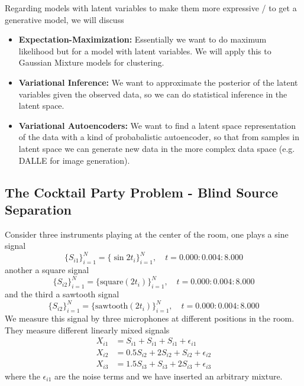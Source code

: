 Regarding models with latent variables to make them more expressive / to
get a generative model, we will discuss

\begin{itemize}
    \item \textbf{Expectation-Maximization:} Essentially we want to do maximum likelihood but for a model with latent variables. We will apply this to Gaussian Mixture models for clustering.
    \item \textbf{Variational Inference:} We want to approximate the posterior of the latent variables given the observed data, so we can do statistical inference in the latent space.
    \item \textbf{Variational Autoencoders:} We want to find a latent space representation of the data with a kind of probabalistic autoencoder,
          so that from samples in latent space we can generate new data in the more complex data space (e.g. DALLE for image generation).
\end{itemize}

\subsection{The Cocktail Party Problem - Blind Source Separation}
Consider three instruments playing at the center of the room, one plays a sine signal
\begin{equation}
    \{S_{i1}\}_{i=1}^N = \{ \sin 2t_i \}_{i=1}^N, \quad t = 0.000:0.004:8.000
\end{equation}
another a square signal
\begin{equation}
    \{S_{i2}\}_{i=1}^N = \{ \text{square}(2t_i) \}_{i=1}^N, \quad t = 0.000:0.004:8.000
\end{equation}
and the third a sawtooth signal
\begin{equation}
    \{S_{i2}\}_{i=1}^N = \{ \text{sawtooth}(2t_i) \}_{i=1}^N, \quad t = 0.000:0.004:8.000
\end{equation}
We measure this signal by three microphones at different positions in the room. They measure different
linearly mixed signals
\begin{equation}
    \begin{aligned}
        X_{i1} &= S_{i1} + S_{i1} + S_{i1} + \epsilon_{i1} \\
        X_{i2} &= 0.5 S_{i2} + 2 S_{i2} + S_{i2} + \epsilon_{i2} \\
        X_{i3} &= 1.5 S_{i3} + S_{i3} + 2 S_{i3} + \epsilon_{i3}
    \end{aligned}
\end{equation}
where the $\epsilon_{i1}$ are the noise terms and we have inserted an arbitrary mixture.

